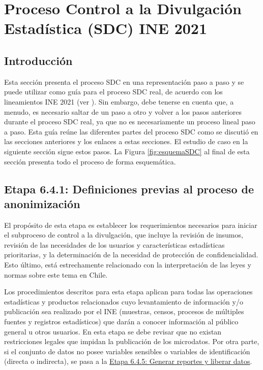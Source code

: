 \documentclass[
]{book}
\theoremstyle{definition}
\theoremstyle{definition}
\theoremstyle{definition}
\theoremstyle{definition}
\theoremstyle{remark}
\begin{document}
\hypertarget{proceso-control-a-la-divulgaciuxf3n-estaduxedstica-sdc-ine-2021}{%
\chapter{Proceso Control a la Divulgación Estadística (SDC) INE 2021}\label{proceso-control-a-la-divulgaciuxf3n-estaduxedstica-sdc-ine-2021}}

\hypertarget{introducciuxf3n-2}{%
\section{Introducción}\label{introducciuxf3n-2}}

Esta sección presenta el proceso SDC en una representación paso a paso y se puede utilizar como guía para el proceso SDC real, de acuerdo con los lineamientos INE 2021 (ver \citep{ine2021}). Sin embargo, debe tenerse en cuenta que, a menudo, es necesario saltar de un paso a otro y volver a los pasos anteriores durante el proceso SDC real, ya que no es necesariamente un proceso lineal paso a paso. Esta guía reúne las diferentes partes del proceso SDC como se discutió en las secciones anteriores y los enlaces a estas secciones. El estudio de caso en la siguiente sección sigue estos pasos. La Figura \ref{fig:esquemaSDC} al final de esta sección presenta todo el proceso de forma esquemática.

\hypertarget{etapa-6.4.1-definiciones-previas-al-proceso-de-anonimizaciuxf3n}{%
\section{Etapa 6.4.1: Definiciones previas al proceso de anonimización}\label{etapa-6.4.1-definiciones-previas-al-proceso-de-anonimizaciuxf3n}}

El propósito de esta etapa es establecer los requerimientos necesarios para iniciar el subproceso de control a la divulgación, que incluye la revisión de insumos, revisión de las necesidades de los usuarios y características estadísticas prioritarias, y la determinación de la necesidad de protección de confidencialidad. Esto último, está estrechamente relacionado con la interpretación de las leyes y normas sobre este tema en Chile.

Los procedimientos descritos para esta etapa aplican para todas las operaciones estadísticas y productos relacionados cuyo levantamiento de información y/o publicación sea realizado por el INE (muestras, censos, procesos de múltiples fuentes y registros estadísticos) que darán a conocer información al público general u otros usuarios.
En esta etapa se debe revisar que no existan restricciones legales que impidan la publicación de los microdatos.
Por otra parte, si el conjunto de datos no posee variables sensibles o variables de identificación (directa o indirecta), se pasa a la \protect\hyperlink{etapa-6.4.5-generar-reportes-y-liberar-datos}{Etapa 6.4.5: Generar reportes y liberar datos}.
\end{document}
